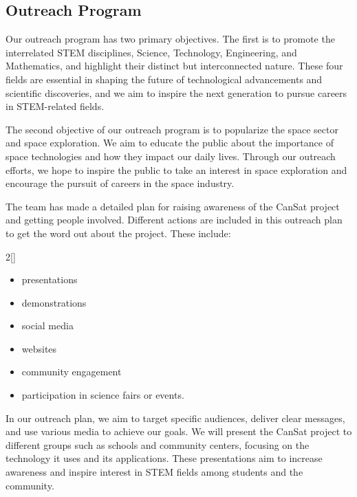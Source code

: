 \subsection{Outreach Program}

Our outreach program has two primary objectives. The first is to promote the interrelated STEM disciplines, Science, Technology, Engineering, and Mathematics, and highlight their distinct but interconnected nature. These four fields are essential in shaping the future of technological advancements and scientific discoveries, and we aim to inspire the next generation to pursue careers in STEM-related fields.

The second objective of our outreach program is to popularize the space sector and space exploration. We aim to educate the public about the importance of space technologies and how they impact our daily lives. 
Through our outreach efforts, we hope to inspire the public to take an interest in space exploration and encourage the pursuit of careers in the space industry.

The team has made a detailed plan for raising awareness of the CanSat project and getting people involved. Different actions are included in this outreach plan to get the word out about the project. These include:
\begin{multicols}{2}[\vspace{-0.5\baselineskip}]
        \begin{itemize}[leftmargin=1cm,itemindent=0.5cm,noitemsep, topsep=0pt, label=$\bullet$]
\item presentations
\item demonstrations
\item social media
\item websites
\item community engagement
\item participation in science fairs or events.
\end{itemize}
\end{multicols}
\vspace*{-0.5\baselineskip}

In our outreach plan, we aim to target specific audiences, deliver clear messages, and use various media to achieve our goals. We will present the CanSat project to different groups such as schools and community centers, focusing on the technology it uses and its applications. These presentations aim to increase awareness and inspire interest in STEM fields among students and the community.


